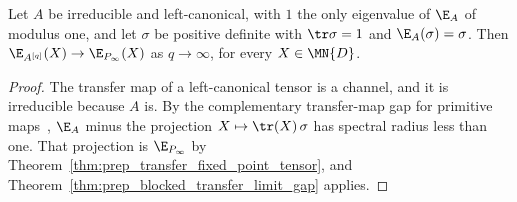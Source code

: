 \begin{theorem}
    \label{thm:prep_blocked_transfer_limit_normal}
    \leanok
    Let $A$ be irreducible and left-canonical, with $1$ the only eigenvalue
    of $\E_A$ of modulus one, and let $\sigma$ be positive definite with
    $\tr\sigma=1$ and $\E_A(\sigma)=\sigma$. Then
    $\E_{A^{[q]}}(X)\to\E_{P_\infty}(X)$ as $q\to\infty$, for every
    $X\in\MN{D}$.
\end{theorem}
\begin{proof}
    \leanok
    The transfer map of a left-canonical tensor is a channel, and it is
    irreducible because $A$ is. By the complementary transfer-map gap for
    primitive maps~\cite[``Complementary transfer-map gap for primitive maps'']{QICLean2026Blueprint},
    $\E_A$ minus the projection $X\mapsto\tr(X)\,\sigma$ has spectral radius
    less than one. That projection is $\E_{P_\infty}$ by
    Theorem~\ref{thm:prep_transfer_fixed_point_tensor}, and
    Theorem~\ref{thm:prep_blocked_transfer_limit_gap} applies.
\end{proof}
